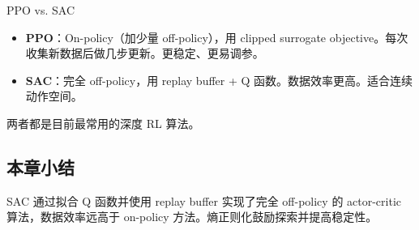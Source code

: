 \begin{importantbox}{PPO vs. SAC}
\begin{itemize}
    \item \textbf{PPO}：On-policy（加少量 off-policy），用 clipped surrogate objective。每次收集新数据后做几步更新。更稳定、更易调参。
    \item \textbf{SAC}：完全 off-policy，用 replay buffer + Q 函数。数据效率更高。适合连续动作空间。
\end{itemize}
两者都是目前最常用的深度 RL 算法。
\end{importantbox}

\subsection{本章小结}

SAC 通过拟合 Q 函数并使用 replay buffer 实现了完全 off-policy 的 actor-critic 算法，数据效率远高于 on-policy 方法。熵正则化鼓励探索并提高稳定性。


